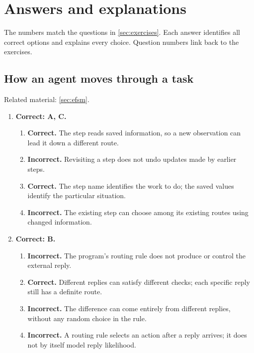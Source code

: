 \section{Answers and explanations}
\label{sec:exercise-answers}

The numbers match the questions in \cref{sec:exercises}. Each answer identifies all correct
options and explains every choice. Question numbers link back to the exercises.

\subsection{How an agent moves through a task}
\noindent Related material: \cref{sec:efsm}.

\begin{enumerate}[start=1,itemsep=0.7\baselineskip]
\item[{\hyperref[exercise:1]{1.}}] \begin{minipage}[t]{\linewidth}
\textbf{Correct: A, C.}
\begin{enumerate}[label=\textnormal{(\Alph*)},leftmargin=*,itemsep=0pt]
\item \textbf{Correct.} The step reads saved information, so a new observation can lead it down a different route.
\item \textbf{Incorrect.} Revisiting a step does not undo updates made by earlier steps.
\item \textbf{Correct.} The step name identifies the work to do; the saved values identify the particular situation.
\item \textbf{Incorrect.} The existing step can choose among its existing routes using changed information.
\end{enumerate}
\end{minipage}

\item[{\hyperref[exercise:2]{2.}}] \begin{minipage}[t]{\linewidth}
\textbf{Correct: B.}
\begin{enumerate}[label=\textnormal{(\Alph*)},leftmargin=*,itemsep=0pt]
\item \textbf{Incorrect.} The program's routing rule does not produce or control the external reply.
\item \textbf{Correct.} Different replies can satisfy different checks; each specific reply still has a definite route.
\item \textbf{Incorrect.} The difference can come entirely from different replies, without any random choice in the rule.
\item \textbf{Incorrect.} A routing rule selects an action after a reply arrives; it does not by itself model reply likelihood.
\end{enumerate}
\end{minipage}


\end{enumerate}
